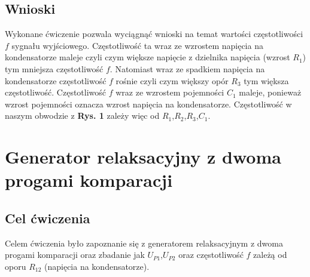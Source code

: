 \documentclass[12pt]{article}
\begin{document}
\subsection{Wnioski}
Wykonane ćwiczenie pozwala wyciągnąć wnioski na temat wartości częstotliwości $f$ sygnału wyjściowego. Częstotliwość ta wraz ze wzrostem napięcia na kondensatorze maleje czyli czym większe napięcie z dzielnika napięcia (wzrost $R_1$) tym mniejsza częstotliwość $f$. Natomiast wraz ze spadkiem napięcia na kondensatorze częstotliwość $f$ rośnie czyli czym większy opór $R_3$ tym większa częstotliwość. Częstotliwość $f$ wraz ze wzrostem pojemności $C_1$ maleje, ponieważ wzrost pojemności oznacza wzrost napięcia na kondensatorze. Częstotliwość w naszym obwodzie z \textbf{Rys. 1} zależy więc od $R_1$,$R_2$,$R_3$,$C_1$.
\section{Generator relaksacyjny z dwoma progami komparacji}
\subsection{Cel ćwiczenia}
Celem ćwiczenia było zapoznanie się z generatorem relaksacyjnym z dwoma progami komparacji oraz zbadanie jak $U_{P1}$,$U_{P2}$ oraz częstotliwość $f$ zależą od oporu $R_{12}$ (napięcia na kondensatorze).
\end{document}
